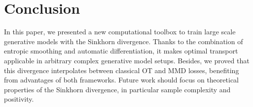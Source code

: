 
\section*{Conclusion}

In this paper, we presented a new computational toolbox to train large scale generative models with the Sinkhorn divergence.
%
Thanks to the combination of entropic smoothing and automatic differentiation, it makes optimal transport applicable in arbitrary complex generative model setups.
%
Besides, we proved that this divergence interpolates between classical OT and MMD losses, benefiting from advantages of both frameworks. 
%
Future work should focus on theoretical properties of the Sinkhorn divergence, in particular sample complexity and positivity.
